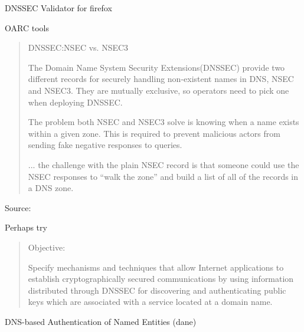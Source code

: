\documentclass[Screen16to9,17pt]{foils}
\begin{document}
\begin{list2}
\item DNSSEC Validator for firefox\\ 
\item OARC tools 
\item {}
\end{list2}


\begin{quote}
DNSSEC:NSEC vs. NSEC3

The Domain Name System Security Extensions(DNSSEC) provide two different records for securely handling non-existent names in DNS, NSEC and NSEC3. They are mutually exclusive, so operators need to pick one when deploying DNSSEC.

The problem both NSEC and NSEC3 solve is knowing when a name exists within a given zone. This is required to prevent malicious actors from sending fake negative responses to queries.

... the challenge with the plain NSEC record is that someone could use the NSEC responses to “walk the zone” and build a list of all of the records in a DNS zone.
\end{quote}

Source:\\
{\small{}}

Perhaps try 



\begin{quote}
Objective:

Specify mechanisms and techniques that allow Internet applications to
establish cryptographically secured communications by using information
distributed through DNSSEC for discovering and authenticating public
keys which are associated with a service located at a domain name.
\end{quote}

DNS-based Authentication of Named Entities (dane)\\
\\
{\footnotesize {}}
\end{document}
